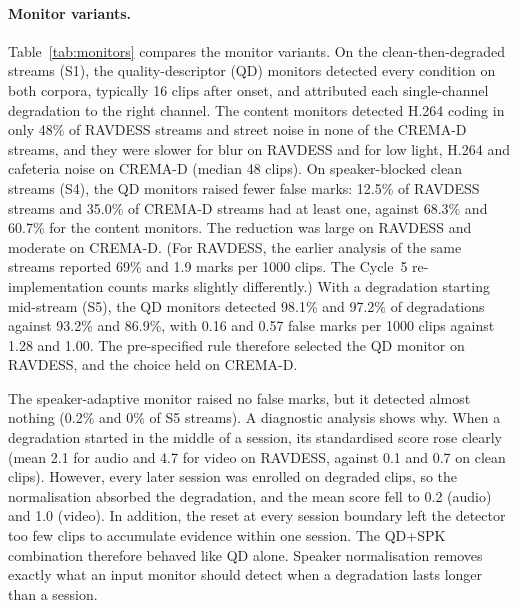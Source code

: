 \paragraph{Monitor variants.} Table~\ref{tab:monitors} compares the monitor variants. On the clean-then-degraded streams (S1), the quality-descriptor (QD) monitors detected every condition on both corpora, typically 16 clips after onset, and attributed each single-channel degradation to the right channel. The content monitors detected H.264 coding in only 48\% of RAVDESS streams and street noise in none of the CREMA-D streams, and they were slower for blur on RAVDESS and for low light, H.264 and cafeteria noise on CREMA-D (median 48 clips). On speaker-blocked clean streams (S4), the QD monitors raised fewer false marks: 12.5\% of RAVDESS streams and 35.0\% of CREMA-D streams had at least one, against 68.3\% and 60.7\% for the content monitors. The reduction was large on RAVDESS and moderate on CREMA-D. (For RAVDESS, the earlier analysis of the same streams reported 69\% and 1.9 marks per 1000 clips. The Cycle~5 re-implementation counts marks slightly differently.) With a degradation starting mid-stream (S5), the QD monitors detected 98.1\% and 97.2\% of degradations against 93.2\% and 86.9\%, with 0.16 and 0.57 false marks per 1000 clips against 1.28 and 1.00. The pre-specified rule therefore selected the QD monitor on RAVDESS, and the choice held on CREMA-D.

The speaker-adaptive monitor raised no false marks, but it detected almost nothing (0.2\% and 0\% of S5 streams). A diagnostic analysis shows why. When a degradation started in the middle of a session, its standardised score rose clearly (mean 2.1 for audio and 4.7 for video on RAVDESS, against 0.1 and 0.7 on clean clips). However, every later session was enrolled on degraded clips, so the normalisation absorbed the degradation, and the mean score fell to 0.2 (audio) and 1.0 (video). In addition, the reset at every session boundary left the detector too few clips to accumulate evidence within one session. The QD+SPK combination therefore behaved like QD alone. Speaker normalisation removes exactly what an input monitor should detect when a degradation lasts longer than a session.

